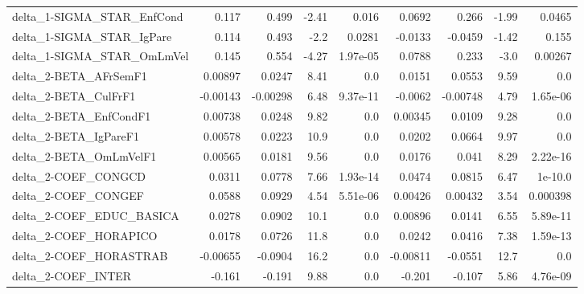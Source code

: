 \begin{tabular}{lrrrrrrrr}
delta\_1-SIGMA\_STAR\_EnfCond            &       0.117 &        0.499 &   -2.41 &    0.016 &     0.0692 &       0.266 &        -1.99 &        0.0465 \\
delta\_1-SIGMA\_STAR\_IgPare             &       0.114 &        0.493 &    -2.2 &   0.0281 &    -0.0133 &     -0.0459 &        -1.42 &         0.155 \\
delta\_1-SIGMA\_STAR\_OmLmVel            &       0.145 &        0.554 &   -4.27 & 1.97e-05 &     0.0788 &       0.233 &         -3.0 &       0.00267 \\
delta\_2-BETA\_AFrSemF1                 &     0.00897 &       0.0247 &    8.41 &      0.0 &     0.0151 &      0.0553 &         9.59 &           0.0 \\
delta\_2-BETA\_CulFrF1                  &    -0.00143 &     -0.00298 &    6.48 & 9.37e-11 &    -0.0062 &    -0.00748 &         4.79 &      1.65e-06 \\
delta\_2-BETA\_EnfCondF1                &     0.00738 &       0.0248 &    9.82 &      0.0 &    0.00345 &      0.0109 &         9.28 &           0.0 \\
delta\_2-BETA\_IgPareF1                 &     0.00578 &       0.0223 &    10.9 &      0.0 &     0.0202 &      0.0664 &         9.97 &           0.0 \\
delta\_2-BETA\_OmLmVelF1                &     0.00565 &       0.0181 &    9.56 &      0.0 &     0.0176 &       0.041 &         8.29 &      2.22e-16 \\
delta\_2-COEF\_CONGCD                   &      0.0311 &       0.0778 &    7.66 & 1.93e-14 &     0.0474 &      0.0815 &         6.47 &       1e-10.0 \\
delta\_2-COEF\_CONGEF                   &      0.0588 &       0.0929 &    4.54 & 5.51e-06 &    0.00426 &     0.00432 &         3.54 &      0.000398 \\
delta\_2-COEF\_EDUC\_BASICA              &      0.0278 &       0.0902 &    10.1 &      0.0 &    0.00896 &      0.0141 &         6.55 &      5.89e-11 \\
delta\_2-COEF\_HORAPICO                 &      0.0178 &       0.0726 &    11.8 &      0.0 &     0.0242 &      0.0416 &         7.38 &      1.59e-13 \\
delta\_2-COEF\_HORASTRAB                &    -0.00655 &      -0.0904 &    16.2 &      0.0 &   -0.00811 &     -0.0551 &         12.7 &           0.0 \\
delta\_2-COEF\_INTER                    &      -0.161 &       -0.191 &    9.88 &      0.0 &     -0.201 &      -0.107 &         5.86 &      4.76e-09 \\

\end{tabular}
